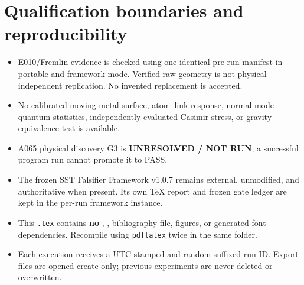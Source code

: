 \documentclass[10pt,a4paper]{article}
\begin{document}
\section{Qualification boundaries and reproducibility}
\begin{itemize}
\item E010/Fremlin evidence is checked using one identical pre-run manifest in portable and framework mode. Verified raw geometry is not physical independent replication. No invented replacement is accepted.
\item No calibrated moving metal surface, atom--link response, normal-mode quantum statistics, independently evaluated Casimir stress, or gravity-equivalence test is available.
\item A065 physical discovery G3 is \textbf{UNRESOLVED / NOT RUN}; a successful program run cannot promote it to PASS.
\item The frozen SST Falsifier Framework v1.0.7 remains external, unmodified, and authoritative when present. Its own TeX report and frozen gate ledger are kept in the per-run framework instance.
\item This \texttt{.tex} contains \textbf{no} \verb||, \verb||, bibliography file, figures, or generated font dependencies. Recompile using \texttt{pdflatex} twice in the same folder.
\item Each execution receives a UTC-stamped and random-suffixed run ID. Export files are opened create-only; previous experiments are never deleted or overwritten.
\end{itemize}
\end{document}
